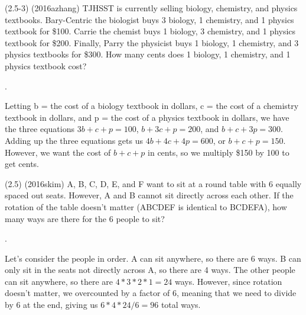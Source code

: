 \documentclass[11pt]{article}
\begin{document}
\begin{problem}
(2.5-3) (2016azhang) TJHSST is currently selling biology, chemistry, and physics textbooks. Bary-Centric the biologist buys 3 biology, 1 chemistry, and 1 physics textbook for \$100. Carrie the chemist buys 1 biology, 3 chemistry, and 1 physics textbook for \$200. Finally, Parry the physicist buys 1 biology, 1 chemistry, and 3 physics textbooks for \$300. How many cents does 1 biology, 1 chemistry, and 1 physics textbook cost?
\end{problem}

\begin{answer}
.
\end{answer}

\begin{solution}
Letting b = the cost of a biology textbook in dollars, c = the cost of a chemistry textbook in dollars, and p = the cost of a physics textbook in dollars, we have the three equations $3b + c + p = 100$, $b + 3c + p = 200$, and $b + c + 3p = 300$. Adding up the three equations gets us $4b + 4c + 4p = 600$, or $b + c + p = 150$. However, we want the cost of $b + c + p$ in cents, so we multiply \$150 by 100 to get  cents.
\end{solution}

\begin{problem}
(2.5) (2016skim) A, B, C, D, E, and F want to sit at a round table with 6 equally spaced out seats. However, A and B cannot sit directly across each other. If the rotation of the table doesn't matter (ABCDEF is identical to BCDEFA), how many ways are there for the 6 people to sit?
\end{problem}

\begin{answer}
.
\end{answer}

\begin{solution}
Let's consider the people in order. A can sit anywhere, so there are 6 ways. B can only sit in the seats not directly across A, so there are 4 ways. The other people can sit anywhere, so there are $4*3*2*1 = 24$ ways. However, since rotation doesn't matter, we overcounted by a factor of $6$, meaning that we need to divide by $6$ at the end, giving us $6*4*24/6 = 96$ total ways.
\end{solution}
\end{document}
